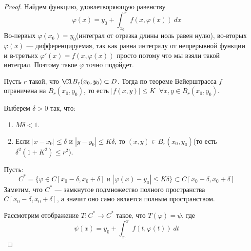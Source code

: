 \begin{proof}
  Найдем функцию, удовлетворяющую равенству
  \begin{equation*}
    \varphi(x) = y_0 + \int_{x_0}^{x} f(x, \varphi(x)) \: dx
  \end{equation*}
  Во-первых $\varphi(x_0) = y_0$(интеграл от отрезка длины ноль равен нулю), во-вторых $\varphi(x)$ --- дифференцируемая, так как равна интегралу от непрерывной функции и в-третьих $\varphi'(x) = f(x, \varphi(x))$ просто потому что мы взяли такой интеграл. Поэтому такое $\varphi$ точно подойдет.

  Пусть $r$ такой, что $\Cl B_r(x_0, y_0) \subset D$. Тогда по теореме Вейерштрасса $f$ ограничена на $B_r(x_0, y_0)$, то есть $|f(x, y)| \leqslant K \;\; \forall x, y \in B_r(x_0, y_0)$.

  Выберем $\delta > 0$ так, что:
  \begin{enumerate}
    \item $M \delta < 1$.
    \item Если $|x - x_0| \leqslant \delta$ и $|y - y_0| \leqslant K \delta$, то $(x, y) \in B_r(x_0, y_0)$(то есть $\delta^2(1 + K^2) \leqslant r^2$).
  \end{enumerate}

  Пусть:
  \begin{equation*}
    C^{*} = \{\varphi \in C[x_0 - \delta, x_0 + \delta]\text{ и } |\varphi(x) - y_0| \leqslant K\delta\} \subset C[x_0 - \delta, x_0 + \delta]
  \end{equation*}
  Заметим, что $C^{*}$ --- замкнутое подмножество полного пространства $C[x_0 - \delta, x_0 + \delta]$, а значит оно само является полным пространством.

  Рассмотрим отображение $T\colon C^{*} \to C^{*}$ такое, что $T(\varphi) = \psi$, где
  \begin{equation*}
    \psi(x) = y_0 + \int_{x_0}^{x} f(t, \varphi(t)) \: dt
  \end{equation*}
  

\end{proof}
